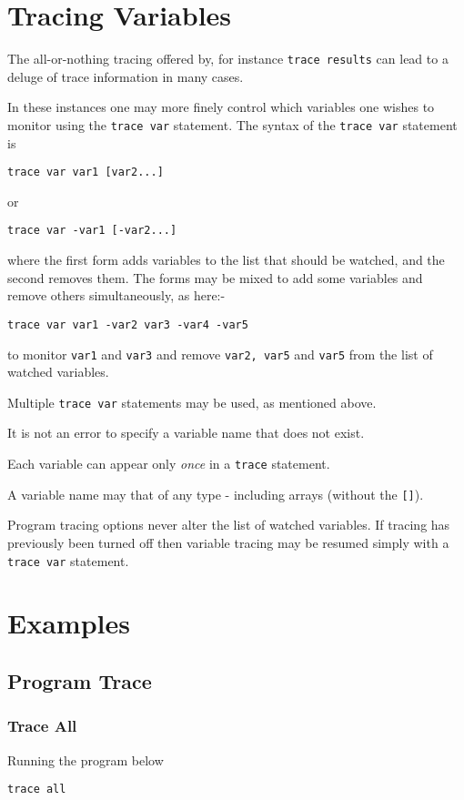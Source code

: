 {\section{Tracing Variables}
The all-or-nothing tracing offered by, for instance \texttt{trace results} can lead to a deluge of trace information in many cases.

In these instances one may more finely control which variables one wishes to monitor using the \texttt{trace var} statement.
The syntax of the \texttt{trace var} statement is 
\begin{verbatim}
trace var var1 [var2...]
\end{verbatim}
or
\begin{verbatim}
trace var -var1 [-var2...]
\end{verbatim}
where the first form adds variables to the list that should be watched, and the second removes them. The forms may be mixed to add some variables and remove others simultaneously, as here:-
\begin{verbatim}
trace var var1 -var2 var3 -var4 -var5
\end{verbatim}
to  monitor \texttt{var1} and \texttt{var3} and remove \texttt{var2, var5} and \texttt{var5} from the list of watched variables. 

Multiple \texttt{trace var} statements may be used, as mentioned above.

It is not an error to specify a variable name that does not exist.

Each variable can appear only \textit{once} in a \texttt{trace} statement.

A variable name may that of any type - including arrays (without the \texttt{[]}).

Program tracing options never alter the list of watched variables. If tracing has previously been turned off then variable tracing may be resumed simply with a \texttt{trace var} statement.

\section{Examples}
\subsection{Program Trace}
\subsubsection{Trace All}
Running the program below
\begin{lstlisting}[label=Trace1, caption=Trace Example 1]
trace all


\end{lstlisting}}
